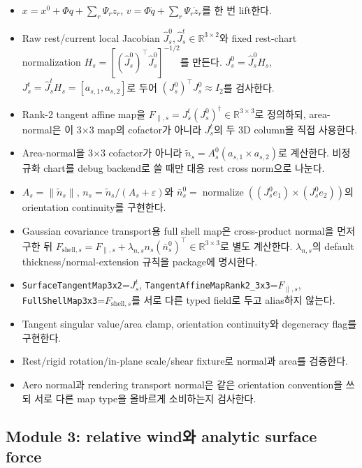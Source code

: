 \documentclass[10pt,a4paper]{article}
\newcommand{\todo}{\textcolor{TodoGray}{\(\square\)}}
\newcommand{\code}[1]{\texttt{#1}}
\begin{document}
\begin{itemize}
  \item[\todo] \(x=x^0+\Phi q+\sum_r\Psi_r z_r\), \(v=\Phi\dot q+\sum_r\Psi_r\dot z_r\)를 한 번 lift한다.
  \item[\todo] Raw rest/current local Jacobian \(\widehat J_s^0,\widehat J_s^t\in\mathbb R^{3\times2}\)와
  fixed rest-chart normalization
  \(H_s=[(\widehat J_s^0)^\top\widehat J_s^0]^{-1/2}\)를 만든다.
  \(J_s^0=\widehat J_s^0H_s\), \(J_s^t=\widehat J_s^tH_s=[a_{s,1},a_{s,2}]\)로 두어
  \((J_s^0)^\top J_s^0\approx I_2\)를 검사한다.
  \item[\todo] Rank-2 tangent affine map을
  \(F_{\parallel,s}=J_s^t(J_s^0)^\dagger\in\mathbb R^{3\times3}\)로 정의하되,
  area-normal은 이 3\(\times\)3 map의 cofactor가 아니라 \(J_s^t\)의 두 3D column을 직접 사용한다.
  \item[\todo] Area-normal을 3\(\times\)3 cofactor가 아니라
  \(\widetilde n_s=A_s^0(a_{s,1}\times a_{s,2})\)로 계산한다.
  비정규화 chart를 debug backend로 쓸 때만 대응 rest cross norm으로 나눈다.
  \item[\todo] \(A_s=\|\widetilde n_s\|\), \(n_s=\widetilde n_s/(A_s+\varepsilon)\)와
  \(\bar n_s^0=\operatorname{normalize}((J_s^0e_1)\times(J_s^0e_2))\)의 orientation continuity를 구현한다.
  \item[\todo] Gaussian covariance transport용 full shell map은 cross-product normal을 먼저 구한 뒤
  \(F_{\mathrm{shell},s}=F_{\parallel,s}+\lambda_{n,s}n_s(\bar n_s^0)^\top\in\mathbb R^{3\times3}\)로 별도 계산한다.
  \(\lambda_{n,s}\)의 default thickness/normal-extension 규칙을 package에 명시한다.
  \item[\todo] \code{SurfaceTangentMap3x2}=\(J_s^t\), \code{TangentAffineMapRank2\_3x3}=\(F_{\parallel,s}\),
  \code{FullShellMap3x3}=\(F_{\mathrm{shell},s}\)를 서로 다른 typed field로 두고 alias하지 않는다.
  \item[\todo] Tangent singular value/area clamp, orientation continuity와 degeneracy flag를 구현한다.
  \item[\todo] Rest/rigid rotation/in-plane scale/shear fixture로 normal과 area를 검증한다.
  \item[\todo] Aero normal과 rendering transport normal은 같은 orientation convention을 쓰되 서로 다른 map type을 올바르게 소비하는지 검사한다.
\end{itemize}

\subsection*{Module 3: relative wind와 analytic surface force}
\end{document}

